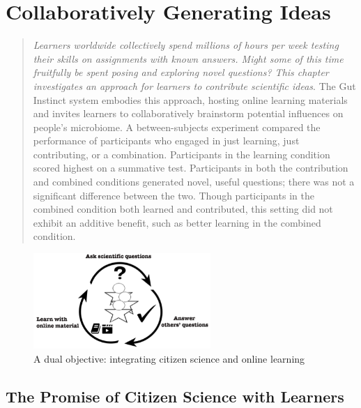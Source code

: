 \chapter{Collaboratively Generating Ideas}

\begin{quote}
\emph{Learners worldwide collectively spend millions of hours per week testing their skills on assignments with known answers. Might some of this time fruitfully be spent posing and exploring novel questions? This chapter investigates an approach for learners to contribute scientific ideas}. The Gut Instinct system embodies this approach, hosting online learning materials and invites learners to collaboratively brainstorm potential influences on people’s microbiome. A between-subjects experiment compared the performance of participants who engaged in just learning, just contributing, or a combination. Participants in the learning condition scored highest on a summative test. Participants in both the contribution and combined conditions generated novel, useful questions; there was not a significant difference between the two. Though participants in the combined condition both learned and contributed, this setting did not exhibit an additive benefit, such as better learning in the combined condition. 
\end{quote}

\begin{figure}[h]
  \centering
  \includegraphics[width=0.6\textwidth]{figures/gutinstinct/gi-1.png}
  \caption[A dual objective: integrating citizen science and online learning]
{A dual objective: integrating citizen science and online learning}
  \label{fig:gi-1}
\end{figure}

\vspace{0.25in}


\section{The Promise of Citizen Science with Learners}

